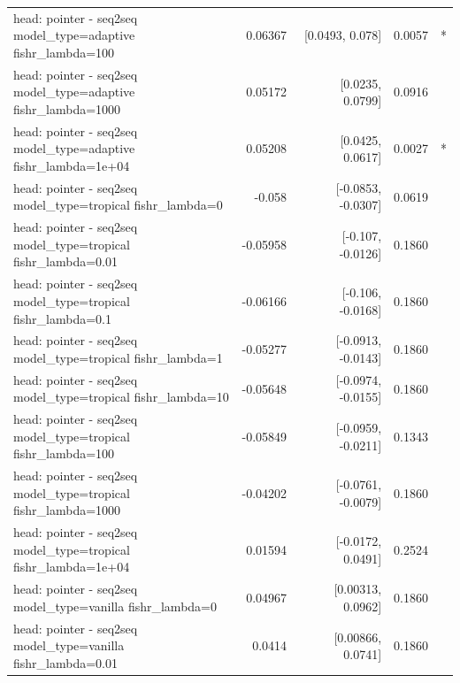 \documentclass[10pt]{article}
\makeatletter
\newcommand{\stackcell}[1]{\begin{tabular}[t]{@{}l@{}}#1\end{tabular}}
\makeatother
\begin{document}
{\begin{longtable}{lrrrl}
\stackcell{head: pointer - seq2seq\\\footnotesize model\_type=adaptive fishr\_lambda=100 } & 0.06367 & [0.0493, 0.078] & 0.0057 & *\\
\stackcell{head: pointer - seq2seq\\\footnotesize model\_type=adaptive fishr\_lambda=1000 } & 0.05172 & [0.0235, 0.0799] & 0.0916 & \\
\stackcell{head: pointer - seq2seq\\\footnotesize model\_type=adaptive fishr\_lambda=1e+04 } & 0.05208 & [0.0425, 0.0617] & 0.0027 & *\\
\stackcell{head: pointer - seq2seq\\\footnotesize model\_type=tropical fishr\_lambda=0 } & -0.058 & [-0.0853, -0.0307] & 0.0619 & \\
\stackcell{head: pointer - seq2seq\\\footnotesize model\_type=tropical fishr\_lambda=0.01 } & -0.05958 & [-0.107, -0.0126] & 0.1860 & \\
\stackcell{head: pointer - seq2seq\\\footnotesize model\_type=tropical fishr\_lambda=0.1 } & -0.06166 & [-0.106, -0.0168] & 0.1860 & \\
\stackcell{head: pointer - seq2seq\\\footnotesize model\_type=tropical fishr\_lambda=1 } & -0.05277 & [-0.0913, -0.0143] & 0.1860 & \\
\stackcell{head: pointer - seq2seq\\\footnotesize model\_type=tropical fishr\_lambda=10 } & -0.05648 & [-0.0974, -0.0155] & 0.1860 & \\
\stackcell{head: pointer - seq2seq\\\footnotesize model\_type=tropical fishr\_lambda=100 } & -0.05849 & [-0.0959, -0.0211] & 0.1343 & \\
\stackcell{head: pointer - seq2seq\\\footnotesize model\_type=tropical fishr\_lambda=1000 } & -0.04202 & [-0.0761, -0.0079] & 0.1860 & \\
\stackcell{head: pointer - seq2seq\\\footnotesize model\_type=tropical fishr\_lambda=1e+04 } & 0.01594 & [-0.0172, 0.0491] & 0.2524 & \\
\stackcell{head: pointer - seq2seq\\\footnotesize model\_type=vanilla fishr\_lambda=0 } & 0.04967 & [0.00313, 0.0962] & 0.1860 & \\
\stackcell{head: pointer - seq2seq\\\footnotesize model\_type=vanilla fishr\_lambda=0.01 } & 0.0414 & [0.00866, 0.0741] & 0.1860 & \\

\end{longtable}}
\end{document}
